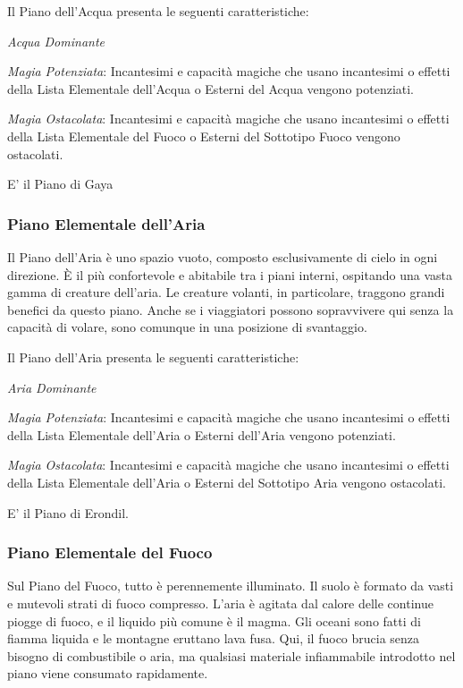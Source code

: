 \documentclass[a4paper,twoside,openany]{book}
\begin{document}
\begin{multicols}{2}
Il Piano dell'Acqua presenta le seguenti caratteristiche:

\emph{Acqua Dominante}

\emph{Magia Potenziata}: Incantesimi e capacità magiche che usano incantesimi o effetti della Lista Elementale dell'Acqua o Esterni del Acqua vengono potenziati.

\emph{Magia Ostacolata}: Incantesimi e capacità magiche che usano incantesimi o effetti della Lista Elementale del Fuoco o Esterni del Sottotipo Fuoco vengono ostacolati.

E' il Piano di Gaya

\subsubsection{Piano Elementale dell'Aria}\label{pianoaria}
Il Piano dell'Aria è uno spazio vuoto, composto esclusivamente di cielo in ogni direzione. È il più confortevole e abitabile tra i piani interni, ospitando una vasta gamma di creature dell'aria. Le creature volanti, in particolare, traggono grandi benefici da questo piano. Anche se i viaggiatori possono sopravvivere qui senza la capacità di volare, sono comunque in una posizione di svantaggio.

Il Piano dell'Aria presenta le seguenti caratteristiche:

\emph{Aria Dominante}

\emph{Magia Potenziata}: Incantesimi e capacità magiche che usano incantesimi o effetti della Lista Elementale dell'Aria o Esterni dell'Aria vengono potenziati.

\emph{Magia Ostacolata}: Incantesimi e capacità magiche che usano incantesimi o effetti della Lista Elementale dell'Aria o Esterni del Sottotipo Aria vengono ostacolati.

E' il Piano di Erondil.

\subsubsection{Piano Elementale del Fuoco}\label{pianofuoco}
Sul Piano del Fuoco, tutto è perennemente illuminato. Il suolo è formato da vasti e mutevoli strati di fuoco compresso. L'aria è agitata dal calore delle continue piogge di fuoco, e il liquido più comune è il magma. Gli oceani sono fatti di fiamma liquida e le montagne eruttano lava fusa. Qui, il fuoco brucia senza bisogno di combustibile o aria, ma qualsiasi materiale infiammabile introdotto nel piano viene consumato rapidamente.


\end{multicols}
\end{document}
